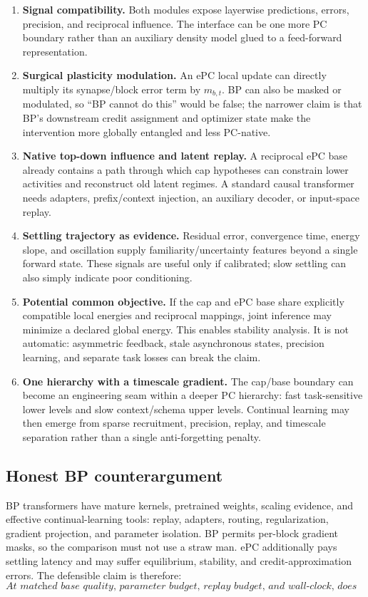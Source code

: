 \documentclass[10pt]{article}
\begin{document}
\begin{enumerate}
\item \textbf{Signal compatibility.}  Both modules expose layerwise predictions, errors,
precision, and reciprocal influence.  The interface can be one more PC boundary rather than
an auxiliary density model glued to a feed-forward representation.

\item \textbf{Surgical plasticity modulation.}  An ePC local update can directly multiply
its synapse/block error term by $m_{b,t}$.  BP can also be masked or modulated, so ``BP cannot
do this'' would be false; the narrower claim is that BP's downstream credit assignment and
optimizer state make the intervention more globally entangled and less PC-native.

\item \textbf{Native top-down influence and latent replay.}  A reciprocal ePC base already
contains a path through which cap hypotheses can constrain lower activities and reconstruct
old latent regimes.  A standard causal transformer needs adapters, prefix/context injection,
an auxiliary decoder, or input-space replay.

\item \textbf{Settling trajectory as evidence.}  Residual error, convergence time, energy
slope, and oscillation supply familiarity/uncertainty features beyond a single forward state.
These signals are useful only if calibrated; slow settling can also simply indicate poor
conditioning.

\item \textbf{Potential common objective.}  If the cap and ePC base share explicitly
compatible local energies and reciprocal mappings, joint inference may minimize a declared
global energy.  This enables stability analysis.  It is not automatic: asymmetric feedback,
stale asynchronous states, precision learning, and separate task losses can break the claim.

\item \textbf{One hierarchy with a timescale gradient.}  The cap/base boundary can become
an engineering seam within a deeper PC hierarchy: fast task-sensitive lower levels and slow
context/schema upper levels.  Continual learning may then emerge from sparse recruitment,
precision, replay, and timescale separation rather than a single anti-forgetting penalty.
\end{enumerate}

\subsection{Honest BP counterargument}
BP transformers have mature kernels, pretrained weights, scaling evidence, and effective
continual-learning tools: replay, adapters, routing, regularization, gradient projection, and
parameter isolation.  BP permits per-block gradient masks, so the comparison must not use a
straw man.  ePC additionally pays settling latency and may suffer equilibrium, stability, and
credit-approximation errors.  The defensible claim is therefore:
\[
\textit{At matched base quality, parameter budget, replay budget, and wall-clock, does the
PC cap exploit an ePC base more effectively?}
\]
\end{document}
